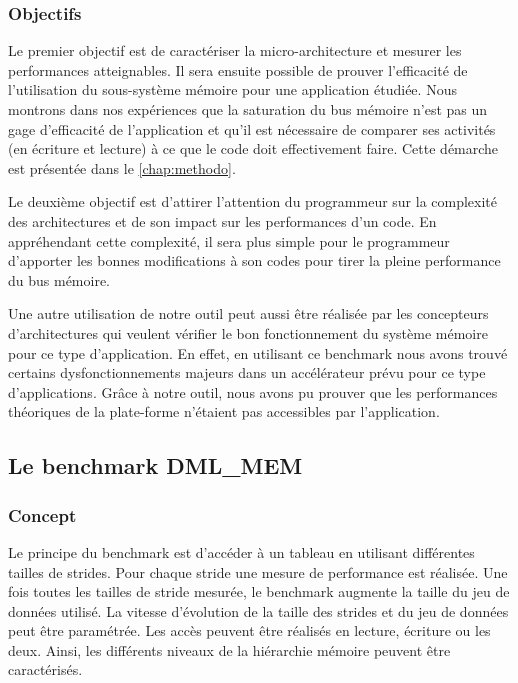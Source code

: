     \subsubsection{Objectifs}
        Le premier objectif est de caractériser la micro-architecture et mesurer les performances atteignables. Il sera ensuite possible de prouver l’efficacité de l’utilisation du sous-système mémoire pour une application étudiée. Nous montrons dans nos expériences que la saturation du bus mémoire n’est pas un gage d’efficacité de l'application et qu’il est nécessaire de comparer ses activités (en écriture et lecture) à ce que le code doit effectivement faire. Cette démarche est présentée dans le \autoref{chap:methodo}.
        
        Le deuxième objectif est d'attirer l'attention du programmeur sur la complexité des architectures et de son impact sur les performances d'un code. En appréhendant cette complexité, il sera plus simple pour le programmeur d'apporter les bonnes modifications à son codes pour tirer la pleine performance du bus mémoire.
        
        Une autre utilisation de notre outil peut aussi être réalisée par les concepteurs d'architectures qui veulent vérifier le bon fonctionnement du système mémoire pour ce type d'application. En effet, en utilisant ce benchmark nous avons trouvé certains dysfonctionnements majeurs dans un accélérateur prévu pour ce type d'applications. Grâce à notre outil, nous avons pu prouver que les performances théoriques de la plate-forme n'étaient pas accessibles par l'application. 



\subsection{Le benchmark DML\_MEM}

    \subsubsection{Concept}
        
        Le principe du benchmark est d'accéder à un tableau en utilisant différentes tailles de strides. Pour chaque stride une mesure de performance est réalisée. Une fois toutes les tailles de stride mesurée, le benchmark augmente la taille du jeu de données utilisé. La vitesse d'évolution de la taille des strides et du jeu de données peut être paramétrée. Les accès peuvent être réalisés en lecture, écriture ou les deux. Ainsi, les différents niveaux de la hiérarchie mémoire peuvent être caractérisés.
        

